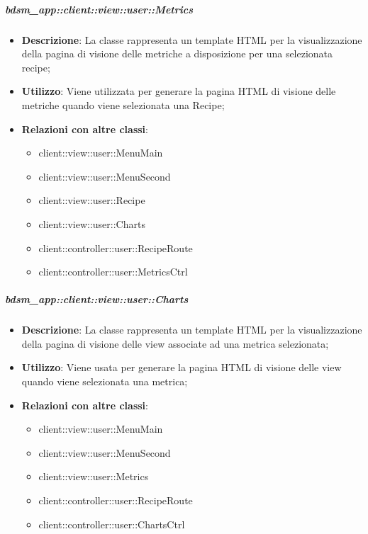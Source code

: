 		\subparagraph{bdsm\_app::client::view::user::Metrics} %
		\label{subp:bdsm_app_client_view_metrics}
			\begin{itemize}
				\item \textbf{Descrizione}: La classe rappresenta un template HTML per la visualizzazione della pagina di visione delle metriche a disposizione per una selezionata recipe;
				\item \textbf{Utilizzo}: Viene utilizzata per generare la pagina HTML di visione delle metriche quando viene selezionata una Recipe;
				\item \textbf{Relazioni con altre classi}:
					\begin{itemize}
						\item client::view::user::MenuMain
						\item client::view::user::MenuSecond
						\item client::view::user::Recipe
						\item client::view::user::Charts
						\item client::controller::user::RecipeRoute
						\item client::controller::user::MetricsCtrl
					\end{itemize}
			\end{itemize}

		\subparagraph{bdsm\_app::client::view::user::Charts} %
		\label{subp:bdsm_app_client_view_user_charts}
			\begin{itemize}
				\item \textbf{Descrizione}: La classe rappresenta un template HTML per la visualizzazione della pagina di visione delle view associate ad una metrica selezionata;
				\item \textbf{Utilizzo}: Viene usata per generare la pagina HTML di visione delle view quando viene selezionata una metrica;
				\item \textbf{Relazioni con altre classi}:
					\begin{itemize}
						\item client::view::user::MenuMain
						\item client::view::user::MenuSecond
						\item client::view::user::Metrics
						\item client::controller::user::RecipeRoute
						\item client::controller::user::ChartsCtrl
					\end{itemize}
			\end{itemize}

